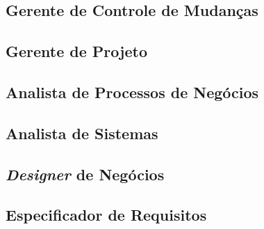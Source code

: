 \subsection{Gerente de Controle de Mudanças}

\subsection{Gerente de Projeto}

\subsection{Analista de Processos de Negócios}

\subsection{Analista de Sistemas}

\subsection{\textit{Designer} de Negócios}

\subsection{Especificador de Requisitos}

